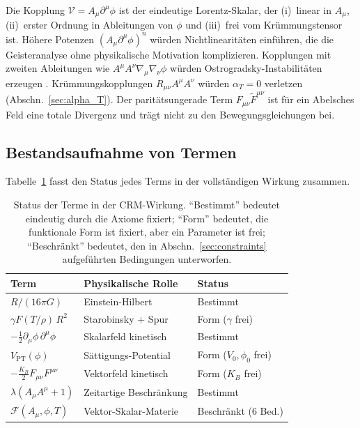 \documentclass[aps,prd,twocolumn,superscriptaddress,nofootinbib]{revtex4-2}
\begin{document}
Die Kopplung $\mathcal{V} = A_\mu\partial^\mu\phi$ ist der eindeutige Lorentz-Skalar, der (i)~linear in $A_\mu$, (ii)~erster Ordnung in Ableitungen von $\phi$ und (iii)~frei vom Kr\"ummungstensor ist. H\"ohere Potenzen $(A_\mu\partial^\mu\phi)^n$ w\"urden Nichtlinearit\"aten einf\"uhren, die die Geisteranalyse ohne physikalische Motivation komplizieren. Kopplungen mit zweiten Ableitungen wie $A^\mu A^\nu\nabla_\mu\nabla_\nu\phi$ w\"urden Ostrogradsky-Instabilit\"aten erzeugen \cite{Woodard2015}. Kr\"ummungskopplungen $R_{\mu\nu}A^\mu A^\nu$ w\"urden $\alpha_T = 0$ verletzen (Abschn.~\ref{sec:alpha_T}). Der parit\"atsungerade Term $F_{\mu\nu}\tilde{F}^{\mu\nu}$ ist f\"ur ein Abelsches Feld eine totale Divergenz und tr\"agt nicht zu den Bewegungsgleichungen bei.

\subsection{Bestandsaufnahme von Termen}

Tabelle~\ref{tab:terms} fasst den Status jedes Terms in der vollst\"andigen Wirkung zusammen.

\begin{table}[b]
\caption{\label{tab:terms}Status der Terme in der CRM-Wirkung. ``Bestimmt'' bedeutet eindeutig durch die Axiome fixiert; ``Form'' bedeutet, die funktionale Form ist fixiert, aber ein Parameter ist frei; ``Beschr\"ankt'' bedeutet, den in Abschn.~\ref{sec:constraints} aufgef\"uhrten Bedingungen unterworfen.}
\begin{ruledtabular}
\begin{tabular}{lll}
Term & Physikalische Rolle & Status \\
\hline
$R/(16\pi G)$ & Einstein-Hilbert & Bestimmt \\
$\gamma F(T/\rho)\,R^2$ & Starobinsky + Spur & Form ($\gamma$ frei) \\
$-\frac{1}{2}\partial_\mu\phi\,\partial^\mu\phi$ & Skalarfeld kinetisch & Bestimmt \\
$V_{\mathrm{PT}}(\phi)$ & S\"attigungs-Potential & Form ($V_0, \phi_0$ frei) \\
$-\frac{K_B}{2}F_{\mu\nu}F^{\mu\nu}$ & Vektorfeld kinetisch & Form ($K_B$ frei) \\
$\lambda(A_\mu A^\mu + 1)$ & Zeitartige Beschr\"ankung & Bestimmt \\
$\mathcal{F}(A_\mu, \phi, T)$ & Vektor-Skalar-Materie & Beschr\"ankt (6 Bed.) \\
\end{tabular}
\end{ruledtabular}
\end{table}
\end{document}
